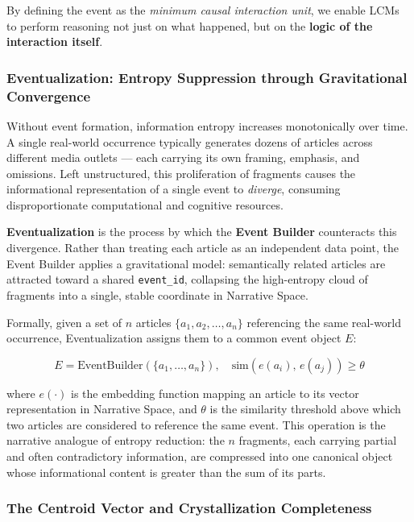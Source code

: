 \documentclass[11pt,a4paper]{article}
\begin{document}
By defining the event as the \emph{minimum causal interaction unit}, we
enable LCMs to perform reasoning not just on what happened, but on the
\textbf{logic of the interaction itself}.

\subsubsection{Eventualization: Entropy Suppression through Gravitational Convergence}

Without event formation, information entropy increases monotonically over
time. A single real-world occurrence typically generates dozens of
articles across different media outlets — each carrying its own framing,
emphasis, and omissions. Left unstructured, this proliferation of
fragments causes the informational representation of a single event to
\emph{diverge}, consuming disproportionate computational and cognitive
resources.

\textbf{Eventualization} is the process by which the \textbf{Event
Builder} counteracts this divergence. Rather than treating each article
as an independent data point, the Event Builder applies a gravitational
model: semantically related articles are attracted toward a shared
\texttt{event\_id}, collapsing the high-entropy cloud of fragments into
a single, stable coordinate in Narrative Space.

Formally, given a set of $n$ articles $\{a_1, a_2, \ldots, a_n\}$
referencing the same real-world occurrence, Eventualization assigns them
to a common event object $E$:

\begin{equation}
  E = \text{EventBuilder}\!\left(\{a_1, \ldots, a_n\}\right), \quad
  \text{sim}(e(a_i),\, e(a_j)) \geq \theta
\end{equation}

where $e(\cdot)$ is the embedding function mapping an article to its
vector representation in Narrative Space, and $\theta$ is the similarity
threshold above which two articles are considered to reference the same
event. This operation is the narrative analogue of entropy reduction:
the $n$ fragments, each carrying partial and often contradictory
information, are compressed into one canonical object whose
informational content is greater than the sum of its parts.

\subsubsection{The Centroid Vector and Crystallization Completeness}
\end{document}

